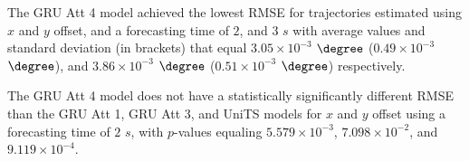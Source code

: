 \begin{table}[!ht]
	\centering
	\caption{The average RMSE in $\degree$ ($\times 10^{-3}$), with standard deviation in brackets, across $k$-fold validation datasets for the trajectories in the $k$-fold testing datasets estimated using $x$ and $y$ offset, different RNN models, and forecasting times.}
	\label{tab:wilcoxon_no_abs_RMSE}
\end{table}

The GRU Att 4 model achieved the lowest RMSE for trajectories estimated using $x$ and $y$ offset, and a forecasting time of $2$, and $3$ $s$ with average values and standard deviation (in brackets) that equal $3.05 \times 10^{-3}$ $\degree$ ($0.49 \times 10^{-3}$ $\degree$), and $3.86 \times 10^{-3}$ $\degree$ ($0.51 \times 10^{-3}$ $\degree$) respectively.

The GRU Att 4 model does not have a statistically significantly different RMSE than the GRU Att 1, GRU Att 3, and UniTS models for $x$ and $y$ offset using a forecasting time of $2$ $s$, with $p$-values equaling $5.579 \times 10^{-3}$, $7.098 \times 10^{-2}$, and $9.119 \times 10^{-4}$.

